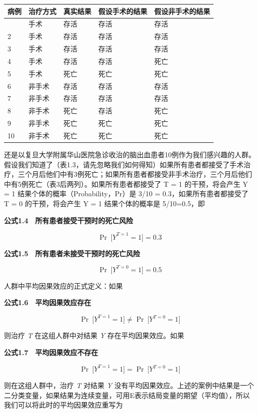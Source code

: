 \documentclass[
  chinese-hans,
  letterpaper,
  DIV=11,
  numbers=noendperiod]{scrreprt}
\newcounter{none} %
\begin{document}
{\def\LTcaptype{none} %
\begin{longtable}[]{@{}lllll@{}}
\toprule\noalign{}
病例 & 治疗方式 & 真实结果 & 假设手术的结果 & 假设非手术的结果 \\
\midrule\noalign{}
\endhead
\bottomrule\noalign{}
\endlastfoot
1 & 手术 & 存活 & 存活 & 存活 \\
2 & 手术 & 存活 & 存活 & 存活 \\
3 & 手术 & 存活 & 存活 & 存活 \\
4 & 手术 & 存活 & 存活 & 死亡 \\
5 & 手术 & 死亡 & 死亡 & 死亡 \\
6 & 非手术 & 存活 & 存活 & 存活 \\
7 & 非手术 & 存活 & 存活 & 存活 \\
8 & 非手术 & 死亡 & 存活 & 死亡 \\
9 & 非手术 & 死亡 & 死亡 & 死亡 \\
10 & 非手术 & 死亡 & 死亡 & 死亡 \\
\end{longtable}
}

还是以复旦大学附属华山医院急诊收治的脑出血患者10例作为我们感兴趣的人群。假设我们知道了（表1.3，请先忽略我们如何得知）如果所有患者都接受了手术治疗，三个月后他们中有3例死亡；如果所有患者都接受非手术治疗，三个月后他们中有5例死亡（表3后两列）。如果所有患者都接受了
T = 1 的干预，将会产生 Y = 1 结果个体的概率（Probability，Pr）是 3/10 =
0.3，如果所有患者都接受了 T = 0 的干预，将会产生 Y = 1 结果个体的概率是
5/10=0.5，即

\textbf{公式1.4　所有患者接受干预时的死亡风险}

\[{\Pr{\ \lbrack}Y}^{T = 1} = 1\rbrack = 0.3\]

\textbf{公式1.5　所有患者未接受干预时的死亡风险}

\[\Pr{\ \lbrack}Y^{T = 0} = 1\rbrack = 0.5\]

人群中平均因果效应的正式定义：如果

\textbf{公式1.6　平均因果效应存在}

\[{\Pr{\ \lbrack}Y}^{T = 1} = 1\rbrack \neq \Pr{\ \lbrack}Y^{T = 0} = 1\rbrack\]

则治疗 \emph{T} 在这组人群中对结果 \emph{Y} 存在平均因果效应。如果

\textbf{公式1.7　平均因果效应不存在}

\[{\Pr{\ \lbrack}Y}^{T = 1} = 1\rbrack = \Pr{\ \lbrack}Y^{T = 0} = 1\rbrack\]

则在这组人群中，治疗 \emph{T} 对结果 \emph{Y}
没有平均因果效应。上述的案例中结果是一个二分类变量，如果结果为连续变量，可用E表示结局变量的期望（平均值），所以我们可以将此时的平均因果效应重写为
\end{document}
